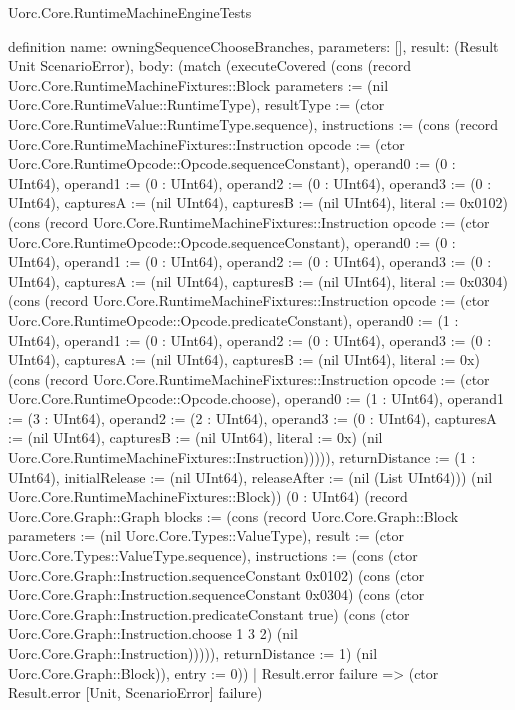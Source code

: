 \begin{lexlean}{Uorc.Core.RuntimeMachineEngineTests}
\begin{semanticmodule}
definition{
  name: owningSequenceChooseBranches,
  parameters: [],
  result: (Result Unit ScenarioError),
  body: (match (executeCovered (cons (record Uorc.Core.RuntimeMachineFixtures::Block {parameters := (nil Uorc.Core.RuntimeValue::RuntimeType), resultType := (ctor Uorc.Core.RuntimeValue::RuntimeType.sequence), instructions := (cons (record Uorc.Core.RuntimeMachineFixtures::Instruction {opcode := (ctor Uorc.Core.RuntimeOpcode::Opcode.sequenceConstant), operand0 := (0 : UInt64), operand1 := (0 : UInt64), operand2 := (0 : UInt64), operand3 := (0 : UInt64), capturesA := (nil UInt64), capturesB := (nil UInt64), literal := 0x0102}) (cons (record Uorc.Core.RuntimeMachineFixtures::Instruction {opcode := (ctor Uorc.Core.RuntimeOpcode::Opcode.sequenceConstant), operand0 := (0 : UInt64), operand1 := (0 : UInt64), operand2 := (0 : UInt64), operand3 := (0 : UInt64), capturesA := (nil UInt64), capturesB := (nil UInt64), literal := 0x0304}) (cons (record Uorc.Core.RuntimeMachineFixtures::Instruction {opcode := (ctor Uorc.Core.RuntimeOpcode::Opcode.predicateConstant), operand0 := (1 : UInt64), operand1 := (0 : UInt64), operand2 := (0 : UInt64), operand3 := (0 : UInt64), capturesA := (nil UInt64), capturesB := (nil UInt64), literal := 0x}) (cons (record Uorc.Core.RuntimeMachineFixtures::Instruction {opcode := (ctor Uorc.Core.RuntimeOpcode::Opcode.choose), operand0 := (1 : UInt64), operand1 := (3 : UInt64), operand2 := (2 : UInt64), operand3 := (0 : UInt64), capturesA := (nil UInt64), capturesB := (nil UInt64), literal := 0x}) (nil Uorc.Core.RuntimeMachineFixtures::Instruction))))), returnDistance := (1 : UInt64), initialRelease := (nil UInt64), releaseAfter := (nil (List UInt64))}) (nil Uorc.Core.RuntimeMachineFixtures::Block)) (0 : UInt64) (record Uorc.Core.Graph::Graph {blocks := (cons (record Uorc.Core.Graph::Block {parameters := (nil Uorc.Core.Types::ValueType), result := (ctor Uorc.Core.Types::ValueType.sequence), instructions := (cons (ctor Uorc.Core.Graph::Instruction.sequenceConstant 0x0102) (cons (ctor Uorc.Core.Graph::Instruction.sequenceConstant 0x0304) (cons (ctor Uorc.Core.Graph::Instruction.predicateConstant true) (cons (ctor Uorc.Core.Graph::Instruction.choose 1 3 2) (nil Uorc.Core.Graph::Instruction))))), returnDistance := 1}) (nil Uorc.Core.Graph::Block)), entry := 0}))
    | Result.error failure => (ctor Result.error [Unit, ScenarioError] failure)
}
\end{semanticmodule}
\end{lexlean}
